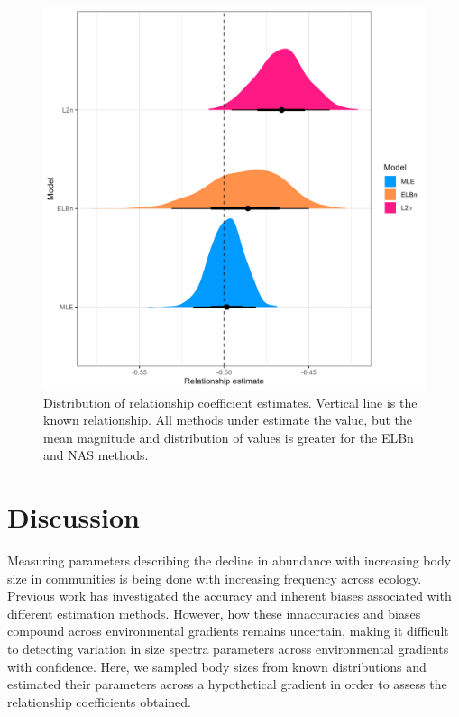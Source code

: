 \documentclass[
]{article}
\begin{document}
\begin{figure}
\centering
\includegraphics{figures/shallow_lambda_relationship_density.png}
\caption{Distribution of relationship coefficient estimates. Vertical
line is the known relationship. All methods under estimate the value,
but the mean magnitude and distribution of values is greater for the
ELBn and NAS methods.}
\end{figure}

\hypertarget{discussion}{%
\section{Discussion}\label{discussion}}

Measuring parameters describing the decline in abundance with increasing
body size in communities is being done with increasing frequency across
ecology. Previous work has investigated the accuracy and inherent biases
associated with different estimation methods. However, how these
innaccuracies and biases compound across environmental gradients remains
uncertain, making it difficult to detecting variation in size spectra
parameters across environmental gradients with confidence. Here, we
sampled body sizes from known distributions and estimated their
parameters across a hypothetical gradient in order to assess the
relationship coefficients obtained.
\end{document}

